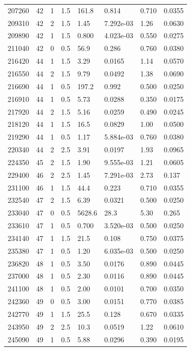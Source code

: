 \documentclass[preview]{standalone}
\begin{document}
{{{{\begin{tabular}{L{1.2cm}C{1.2cm} C{0.3cm}C{0.5cm} C{1.4cm}C{1.4cm} C{1.4cm}C{1.4cm}}
  207260  &    42  & 1     & 1.5 &  161.8  & 0.814  & 0.710 &  0.0355   \\ 
  209310  &    42  & 2     & 1.5 &  1.45  & 7.292e-03  & 1.26 &  0.0630   \\ 
  209890  &    42  & 1     & 1.5 &  0.800  & 4.023e-03  & 0.550 &  0.0275   \\ 
  211040  &    42  & 0     & 0.5 &  56.9  & 0.286  & 0.760 &  0.0380   \\ 
  216420  &    44  & 1     & 1.5 &  3.29  & 0.0165  & 1.14 &  0.0570   \\ 
  216550  &    44  & 2     & 1.5 &  9.79  & 0.0492  & 1.38 &  0.0690   \\ 
  216690  &    44  & 1     & 0.5 &  197.2  & 0.992  & 0.500 &  0.0250   \\ 
  216910  &    44  & 1     & 0.5 &  5.73  & 0.0288  & 0.350 &  0.0175   \\ 
  217920  &    44  & 2     & 1.5 &  5.16  & 0.0259  & 0.490 &  0.0245   \\ 
  218120  &    44  & 1     & 1.5 &  16.5  & 0.0829  & 1.00 &  0.0500   \\ 
  219290  &    44  & 1     & 0.5 &  1.17  & 5.884e-03  & 0.760 &  0.0380   \\ 
  220340  &    44  & 2     & 2.5 &  3.91  & 0.0197  & 1.93 &  0.0965   \\ 
  224350  &    45  & 2     & 1.5 &  1.90  & 9.555e-03  & 1.21 &  0.0605   \\ 
  229400  &    46  & 2     & 2.5 &  1.45  & 7.291e-03  & 2.73 &  0.137   \\ 
  231100  &    46  & 1     & 1.5 &  44.4  & 0.223  & 0.710 &  0.0355   \\ 
  232540  &    47  & 2     & 1.5 &  6.39  & 0.0321  & 0.500 &  0.0250   \\ 
  233040  &    47  & 0     & 0.5 &  5628.6  & 28.3  & 5.30 &  0.265   \\ 
  233610  &    47  & 1     & 0.5 &  0.700  & 3.520e-03  & 0.500 &  0.0250   \\ 
  234140  &    47  & 1     & 1.5 &  21.5  & 0.108  & 0.750 &  0.0375   \\ 
  235380  &    47  & 1     & 0.5 &  1.20  & 6.035e-03  & 0.500 &  0.0250   \\ 
  236820  &    48  & 1     & 0.5 &  3.50  & 0.0176  & 0.890 &  0.0445   \\ 
  237000  &    48  & 1     & 0.5 &  2.30  & 0.0116  & 0.890 &  0.0445   \\ 
  241100  &    48  & 1     & 0.5 &  2.00  & 0.0101  & 0.700 &  0.0350   \\ 
  242360  &    49  & 0     & 0.5 &  3.00  & 0.0151  & 0.770 &  0.0385   \\ 
  242770  &    49  & 1     & 1.5 &  25.5  & 0.128  & 0.670 &  0.0335   \\ 
  243950  &    49  & 2     & 2.5 &  10.3  & 0.0519  & 1.22 &  0.0610   \\ 
  245090  &    49  & 1     & 0.5 &  5.88  & 0.0296  & 0.390 &  0.0195   \\ 
\hline 
\end{tabular} 

}}}}
\end{document}
